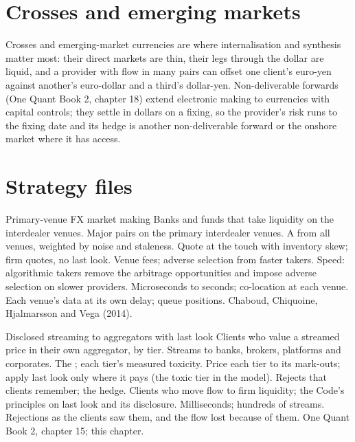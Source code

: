\section{Crosses and emerging markets}

Crosses and emerging-market currencies are where internalisation and synthesis matter most: their direct markets are thin, their legs through the
dollar are liquid, and a provider with flow in many pairs can offset one client's euro-yen against another's euro-dollar and a third's dollar-yen.
Non-deliverable forwards (One Quant Book 2, chapter 18) extend electronic making to currencies with capital controls; they settle in dollars on a
fixing, so the provider's risk runs to the fixing date and its hedge is another non-deliverable forward or the onshore market where it has access.

\section{Strategy files}

\begin{strategyfile}{Primary-venue FX market making}\label{strat:hf:fx-market-making:primary}
 Banks and funds that take liquidity on the interdealer venues.
 Major pairs on the primary interdealer venues.
 A  from all venues, weighted by noise and staleness.
 Quote at the touch with inventory skew; firm quotes, no last look.
 Venue fees; adverse selection from faster takers.
 Speed: algorithmic takers remove the arbitrage opportunities and impose adverse selection on slower providers.
 Microseconds to seconds; co-location at each venue.
 Each venue's data at its own delay; queue positions.
 Chaboud, Chiquoine, Hjalmarsson and Vega (2014).
\end{strategyfile}

\begin{strategyfile}{Disclosed streaming to aggregators with last look}\label{strat:hf:fx-market-making:stream}
 Clients who value a streamed price in their own aggregator, by tier.
 Streams to banks, brokers, platforms and corporates.
 The ; each tier's measured toxicity.
 Price each tier to its mark-outs; apply last look only where it pays (the toxic tier in the model).
 Rejects that clients remember; the hedge.
 Clients who move flow to firm liquidity; the Code's principles on last look and its disclosure.
 Milliseconds; hundreds of streams.
 Rejections as the clients saw them, and the flow lost because of them.
 One Quant Book 2, chapter 15; this chapter.
\end{strategyfile}

